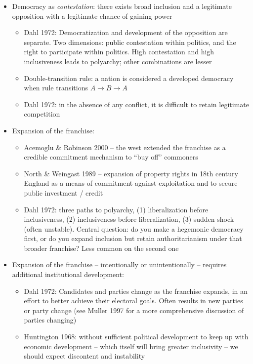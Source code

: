 \documentclass[12pt]{article}
\begin{document}
\begin{itemize}
    \item Democracy as \emph{contestation}: there exists broad inclusion and a legitimate opposition with a legitimate chance of gaining power
    \begin{itemize}
        \item Dahl 1972: Democratization and development of the opposition are separate. Two dimensions: public contestation within politics, and the right to participate within politics. High contestation and high inclusiveness leads to polyarchy; other combinations are lesser
        \item Double-transition rule: a nation is considered a developed democracy when rule transitions $A \to B \to A$
        \item Dahl 1972: in the absence of any conflict, it is difficult to retain legitimate competition
    \end{itemize}
    \item Expansion of the franchise:
    \begin{itemize}
        \item Acemoglu \& Robinson 2000 -- the west extended the franchise as a credible commitment mechanism to ``buy off'' commoners
        \item North \& Weingast 1989 -- expansion of property rights in 18th century England as a means of commitment against exploitation and to secure public investment / credit
        \item Dahl 1972: three paths to polyarchy, (1) liberalization before inclusiveness, (2) inclusiveness before liberalization, (3) sudden shock (often unstable). Central question: do you make a hegemonic democracy first, or do you expand inclusion but retain authoritarianism under that broader franchise? Less common on the second one
    \end{itemize}
    \item Expansion of the franchise -- intentionally or unintentionally -- requires additional institutional development:
    \begin{itemize}
        \item Dahl 1972: Candidates and parties change as the franchise expands, in an effort to better achieve their electoral goals. Often results in new parties or party change (see Muller 1997 for a more comprehensive discussion of parties changing)
        \item Huntington 1968: without sufficient political development to keep up with economic development -- which itself will bring greater inclusivity -- we should expect discontent and instability

\end{itemize}
\end{itemize}
\end{document}
